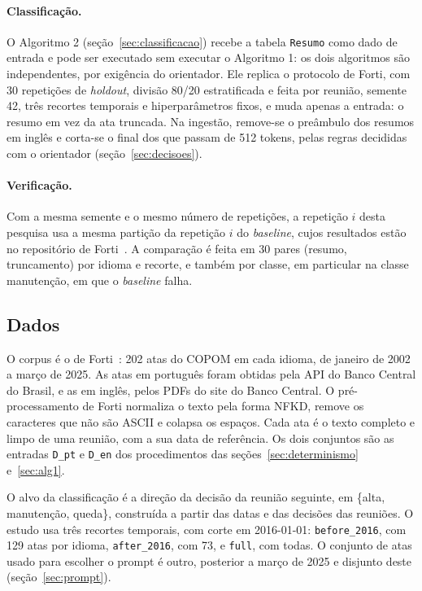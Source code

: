 \documentclass[12pt]{article}
\begin{document}
\paragraph{Classificação.} O Algoritmo 2 (seção~\ref{sec:classificacao}) recebe
a tabela \texttt{Resumo} como dado de entrada e pode ser executado sem executar
o Algoritmo 1: os dois algoritmos são independentes, por exigência do
orientador. Ele replica o protocolo de Forti, com 30 repetições de
\textit{holdout}, divisão 80/20 estratificada e feita por reunião, semente 42,
três recortes temporais e hiperparâmetros fixos, e muda apenas a entrada: o
resumo em vez da ata truncada. Na ingestão, remove-se o preâmbulo dos resumos em
inglês e corta-se o final dos que passam de 512 tokens, pelas regras decididas
com o orientador (seção~\ref{sec:decisoes}).

\paragraph{Verificação.} Com a mesma semente e o mesmo número de repetições, a
repetição $i$ desta pesquisa usa a mesma partição da repetição $i$ do
\textit{baseline}, cujos resultados estão no repositório de
Forti~\cite{forti2025}. A comparação é feita em 30 pares (resumo, truncamento)
por idioma e recorte, e também por classe, em particular na classe manutenção,
em que o \textit{baseline} falha.

\subsection{Dados}\label{sec:dados}

O corpus é o de Forti~\cite{forti2025}: 202 atas do COPOM em cada idioma, de
janeiro de 2002 a março de 2025. As atas em português foram obtidas pela API do
Banco Central do Brasil, e as em inglês, pelos PDFs do site do Banco Central.
O pré-processamento de Forti normaliza o texto pela forma NFKD, remove os
caracteres que não são ASCII e colapsa os espaços. Cada ata é o texto completo e
limpo de uma reunião, com a sua data de referência. Os dois conjuntos são as
entradas \texttt{D\_pt} e \texttt{D\_en} dos procedimentos das
seções~\ref{sec:determinismo} e~\ref{sec:alg1}.

O alvo da classificação é a direção da decisão da reunião seguinte, em
\{alta, manutenção, queda\}, construída a partir das datas e das decisões das
reuniões. O estudo usa três recortes temporais, com corte em 2016-01-01:
\texttt{before\_2016}, com 129 atas por idioma, \texttt{after\_2016}, com 73, e
\texttt{full}, com todas. O conjunto de atas usado para escolher o prompt é
outro, posterior a março de 2025 e disjunto deste (seção~\ref{sec:prompt}).
\end{document}
